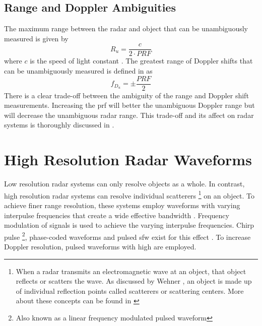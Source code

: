 \documentclass[class=report,11pt,crop=false]{standalone}
\begin{document}
    \subsection{Range and Doppler Ambiguities} %
    The maximum range between the radar and object that can be unambiguously measured is given by
    \begin{equation} \label{eq:range_unambiguous}
        R_{u} = \frac{c}{2 \cdot PRF}
    \end{equation}
    where $c$ is the speed of light constant \cite{pomr}. The greatest range of Doppler shifts that can be unambiguously measured is defined in \cite{pomr} as
    \begin{equation}\label{eq:doppler_unambiguous}
        f_{D_{u}} = \pm \frac{PRF}{2}
    \end{equation}
    There is a clear trade-off between the ambiguity of the range and Doppler shift measurements. Increasing the \gls{prf} will better the unambiguous Doppler range but will decrease the unambiguous radar range. This trade-off and its affect on radar systems is thoroughly discussed in \cite{pomr}. 

\section{High Resolution Radar Waveforms \label{sec:theory_hrr_waves}}
Low resolution radar systems can only resolve objects as a whole. In contrast, high resolution radar systems can resolve individual scatterers \footnote{When a radar transmits an electromagnetic wave at an object, that object reflects or scatters the wave. As discussed by Wehner \cite{Wehner1995}, an object is made up of individual reflection points called scatterers or scattering centers. More about these concepts can be found in \cite{pomr,Wehner1995}} on an object. To achieve finer range resolution, these systems employ waveforms with varying interpulse frequencies that create a wide effective bandwidth \cite{pomr}. %
Frequency modulation of signals is used to achieve the varying interpulse frequencies. Chirp pulse \footnote{Also known as a linear frequency modulated pulsed waveform}, phase-coded waveforms and pulsed \gls{sfw} exist for this effect \cite{ISARtextbook_Martorella}. To increase Doppler resolution, pulsed waveforms with high \cite{prf} are employed.
\end{document}
